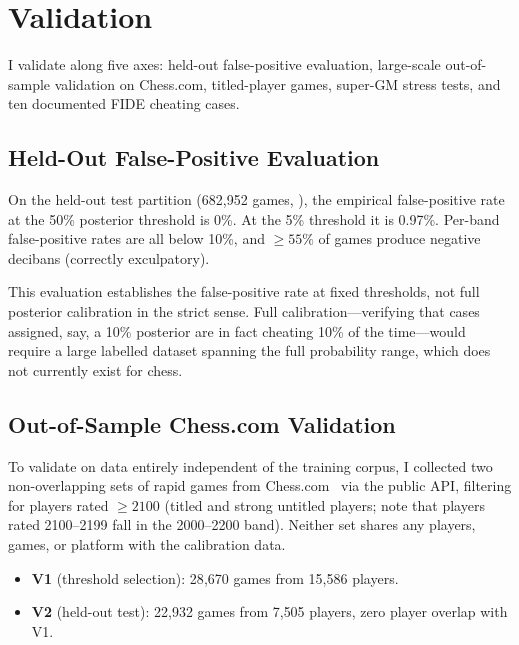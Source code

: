 \documentclass[11pt,a4paper]{article}
\theoremstyle{definition}
\begin{document}
\section{Validation}
\label{sec:validation}

I validate along five axes: held-out false-positive evaluation,
large-scale out-of-sample validation on Chess.com, titled-player games,
super-GM stress tests, and ten documented FIDE cheating cases.

\subsection{Held-Out False-Positive Evaluation}
\label{sec:fp}

On the held-out test partition (682{,}952 games,
), the empirical false-positive rate at the
50\% posterior threshold is 0\%.  At the 5\% threshold it is 0.97\%.
Per-band false-positive rates are all below 10\%, and $\ge 55\%$ of
games produce negative decibans (correctly exculpatory).

This evaluation establishes the false-positive rate at
fixed thresholds, not full posterior calibration in the strict sense.
Full calibration---verifying that cases assigned, say, a 10\%
posterior are in fact cheating 10\% of the time---would require a
large labelled dataset spanning the full probability range, which does
not currently exist for chess.

\subsection{Out-of-Sample Chess.com Validation}
\label{sec:oos}

To validate on data entirely independent of the training corpus, I
collected two non-overlapping sets of rapid games from
Chess.com~\citep{chesscom2024} via the public API, filtering for
players rated $\ge 2100$ (titled and strong untitled players; note
that players rated 2100--2199 fall in the 2000--2200 band).  Neither
set shares any players, games, or platform with the calibration data.

\begin{itemize}[nosep]
  \item \textbf{V1} (threshold selection): 28{,}670 games from
    15{,}586 players.
  \item \textbf{V2} (held-out test): 22{,}932 games from 7{,}505
    players, zero player overlap with V1.
\end{itemize}
\end{document}
